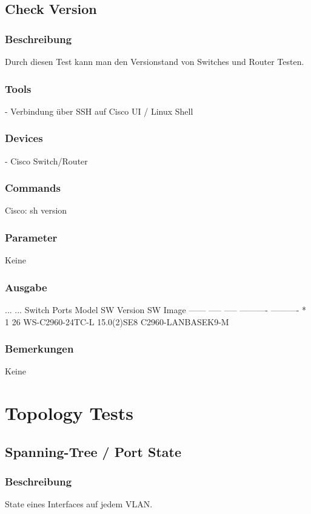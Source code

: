 \documentclass[a4,12pt]{scrartcl}
\begin{document}
\subsection{Check Version}
\subsubsection{Beschreibung}
Durch diesen Test kann man den Versionstand von Switches und Router Testen.
\subsubsection{Tools}
- Verbindung über SSH auf Cisco UI / Linux Shell
\subsubsection{Devices}
- Cisco Switch/Router
\subsubsection{Commands}
Cisco: sh version
\subsubsection{Parameter}
Keine
\subsubsection{Ausgabe}
...\newline
...\newline
Switch Ports Model              SW Version            SW Image\newline
------ ----- -----              ----------            ----------\newline
*    1 26    WS-C2960-24TC-L    15.0(2)SE8            C2960-LANBASEK9-M
\subsubsection{Bemerkungen}
Keine

\newpage
\section{Topology Tests}

\subsection{Spanning-Tree / Port State}
\subsubsection{Beschreibung}
State eines Interfaces auf jedem VLAN.
\end{document}
